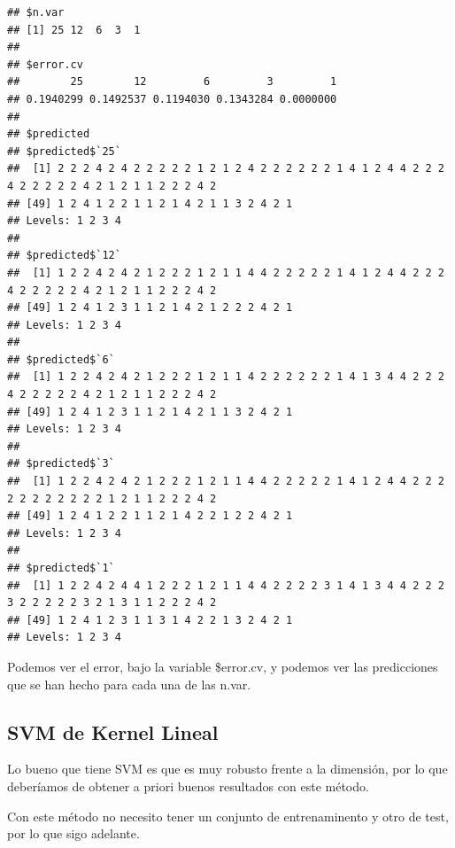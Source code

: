 \documentclass[]{article}
\newenvironment{Shaded}{\begin{snugshade}}{\end{snugshade}}
\newcommand{\KeywordTok}[1]{\textcolor[rgb]{0.13,0.29,0.53}{\textbf{#1}}}
\newcommand{\DataTypeTok}[1]{\textcolor[rgb]{0.13,0.29,0.53}{#1}}
\newcommand{\DecValTok}[1]{\textcolor[rgb]{0.00,0.00,0.81}{#1}}
\newcommand{\StringTok}[1]{\textcolor[rgb]{0.31,0.60,0.02}{#1}}
\newcommand{\OperatorTok}[1]{\textcolor[rgb]{0.81,0.36,0.00}{\textbf{#1}}}
\newcommand{\NormalTok}[1]{#1}
\begin{document}
\begin{Shaded}
\end{Shaded}

\begin{verbatim}
## $n.var
## [1] 25 12  6  3  1
## 
## $error.cv
##        25        12         6         3         1 
## 0.1940299 0.1492537 0.1194030 0.1343284 0.0000000 
## 
## $predicted
## $predicted$`25`
##  [1] 2 2 2 4 2 4 2 2 2 2 2 1 2 1 2 4 2 2 2 2 2 2 1 4 1 2 4 4 2 2 2 4 2 2 2 2 2 4 2 1 2 1 1 2 2 2 4 2
## [49] 1 2 4 1 2 2 1 1 2 1 4 2 1 1 3 2 4 2 1
## Levels: 1 2 3 4
## 
## $predicted$`12`
##  [1] 1 2 2 4 2 4 2 1 2 2 2 1 2 1 1 4 4 2 2 2 2 2 1 4 1 2 4 4 2 2 2 4 2 2 2 2 2 4 2 1 2 1 1 2 2 2 4 2
## [49] 1 2 4 1 2 3 1 1 2 1 4 2 1 2 2 2 4 2 1
## Levels: 1 2 3 4
## 
## $predicted$`6`
##  [1] 1 2 2 4 2 4 2 1 2 2 2 1 2 1 1 4 2 2 2 2 2 2 1 4 1 3 4 4 2 2 2 4 2 2 2 2 2 4 2 1 2 1 1 2 2 2 4 2
## [49] 1 2 4 1 2 3 1 1 2 1 4 2 1 1 3 2 4 2 1
## Levels: 1 2 3 4
## 
## $predicted$`3`
##  [1] 1 2 2 4 2 4 2 1 2 2 2 1 2 1 1 4 4 2 2 2 2 2 1 4 1 2 4 4 2 2 2 2 2 2 2 2 2 2 2 1 2 1 1 2 2 2 4 2
## [49] 1 2 4 1 2 2 1 1 2 1 4 2 2 1 2 2 4 2 1
## Levels: 1 2 3 4
## 
## $predicted$`1`
##  [1] 1 2 2 4 2 4 4 1 2 2 2 1 2 1 1 4 4 2 2 2 2 3 1 4 1 3 4 4 2 2 2 3 2 2 2 2 2 3 2 1 3 1 1 2 2 2 4 2
## [49] 1 2 4 1 2 3 1 1 3 1 4 2 2 1 3 2 4 2 1
## Levels: 1 2 3 4
\end{verbatim}

Podemos ver el error, bajo la variable \$error.cv, y podemos ver las
predicciones que se han hecho para cada una de las n.var.

\subsection{SVM de Kernel Lineal}\label{svm-de-kernel-lineal}

Lo bueno que tiene SVM es que es muy robusto frente a la dimensión, por
lo que deberíamos de obtener a priori buenos resultados con este método.

Con este método no necesito tener un conjunto de entrenaminento y otro
de test, por lo que sigo adelante.
\end{document}
